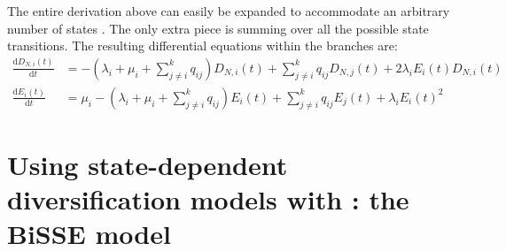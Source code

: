 The entire derivation above can easily be expanded to accommodate an arbitrary number of states \citep{FitzJohn2012}.
The only extra piece is summing over all the possible state transitions.
%
%
The resulting differential equations within the branches are:
\begin{align*}
    \frac{\mathrm{d}D_{N,i}(t)}{\mathrm{d}t} &= - \left(\lambda_i + \mu_i + \sum\limits_{j \neq i}^k q_{ij} \right)D_{N,i}(t) + \sum\limits_{j \neq i}^k q_{ij} D_{N,j}(t) + 2\lambda_iE_i(t)D_{N,i}(t) \\
    \frac{\mathrm{d}E_i(t)}{\mathrm{d}t} &= \mu_i - \left(\lambda_i + \mu_i + \sum\limits_{j \neq i}^k q_{ij} \right)E_i(t) + \sum\limits_{j \neq i}^k q_{ij} E_j(t) + \lambda_i E_i(t)^2
\end{align*}

\section{Using state-dependent diversification models with \RevBayes: the BiSSE model} \label{sec:CDBDP}

